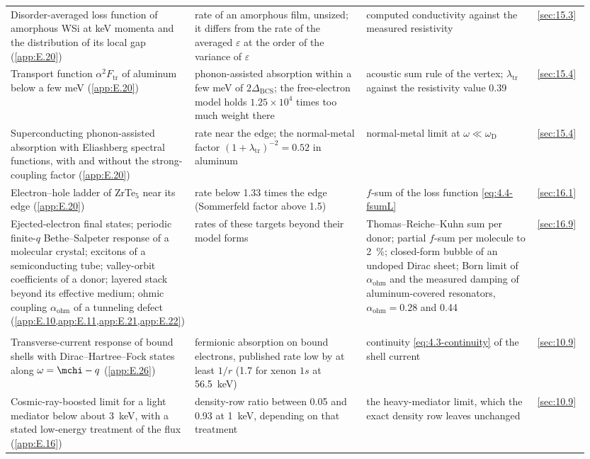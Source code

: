 {\begin{longtable}{@{}>{\raggedright\arraybackslash}p{0.25\linewidth}>{\raggedright\arraybackslash}p{0.305\linewidth}>{\raggedright\arraybackslash}p{0.305\linewidth}>{\raggedright\arraybackslash}p{0.09\linewidth}@{}}
  Disorder-averaged loss function of amorphous WSi at keV momenta and the distribution of its local gap (\cref{app:E.20}) & rate of an amorphous film, unsized; it differs from the rate of the averaged $\varepsilon$ at the order of the variance of $\varepsilon$ & computed conductivity against the measured resistivity & \cref{sec:15.3} \\
  Transport function $\alpha^2F_{\mathrm{tr}}$ of aluminum below a few meV (\cref{app:E.20}) & phonon-assisted absorption within a few meV of $2\Delta_{\mathrm{BCS}}$; the free-electron model holds $1.25\times10^4$ times too much weight there & acoustic sum rule of the vertex; $\lambda_{\mathrm{tr}}$ against the resistivity value 0.39 & \cref{sec:15.4} \\
  Superconducting phonon-assisted absorption with Eliashberg spectral functions, with and without the strong-coupling factor (\cref{app:E.20}) & rate near the edge; the normal-metal factor $(1 + \lambda_{\mathrm{tr}})^{-2} = 0.52$ in aluminum & normal-metal limit at $\omega \ll \omega_{\mathrm{D}}$ & \cref{sec:15.4} \\
  Electron--hole ladder of ZrTe$_5$ near its edge (\cref{app:E.20}) & rate below 1.33 times the edge (Sommerfeld factor above 1.5) & $f$-sum of the loss function \cref{eq:4.4-fsumL} & \cref{sec:16.1} \\
  Ejected-electron final states; periodic finite-$q$ Bethe--Salpeter response of a molecular crystal; excitons of a semiconducting tube; valley-orbit coefficients of a donor; layered stack beyond its effective medium; ohmic coupling $\alpha_{\mathrm{ohm}}$ of a tunneling defect (\cref{app:E.10,app:E.11,app:E.21,app:E.22}) & rates of these targets beyond their model forms & Thomas--Reiche--Kuhn sum per donor; partial $f$-sum per molecule to \SI{2}{\percent}; closed-form bubble of an undoped Dirac sheet; Born limit of $\alpha_{\mathrm{ohm}}$ and the measured damping of aluminum-covered resonators, $\alpha_{\mathrm{ohm}} = 0.28$ and 0.44 & \cref{sec:16.9} \\
  \midrule
  \multicolumn{4}{@{}l}{\emph{Published limits}} \\
  Transverse-current response of bound shells with Dirac--Hartree--Fock states along $\omega = \mchi - q$ (\cref{app:E.26}) & fermionic absorption on bound electrons, published rate low by at least $1/r$ (1.7 for xenon $1s$ at \SI{56.5}{keV}) & continuity \cref{eq:4.3-continuity} of the shell current & \cref{sec:10.9} \\
  Cosmic-ray-boosted limit for a light mediator below about \SI{3}{keV}, with a stated low-energy treatment of the flux (\cref{app:E.16}) & density-row ratio between 0.05 and 0.93 at \SI{1}{keV}, depending on that treatment & the heavy-mediator limit, which the exact density row leaves unchanged & \cref{sec:10.9} \\
\end{longtable}}

